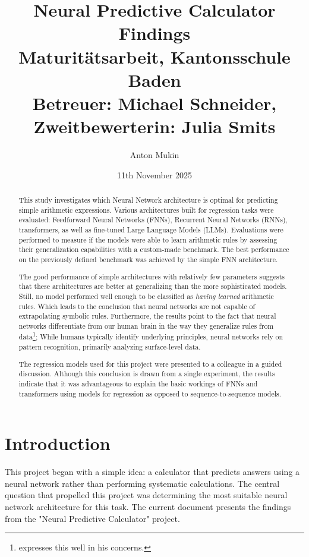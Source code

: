 \documentclass{article}
\title{\huge Neural Predictive Calculator
\\[0em]
{\LARGE Findings}
\\[0em]
{\large Maturitätsarbeit, Kantonsschule Baden}
\\[-0.5em]
{\large Betreuer: Michael Schneider, Zweitbewerterin: Julia Smits}}
\author{Anton Mukin}
\date{11th November 2025}
\begin{document}
\maketitle

\begin{abstract}
    This study investigates which Neural Network architecture is optimal for predicting 
    simple arithmetic expressions. 
    Various architectures built for regression tasks were evaluated: Feedforward Neural Networks (FNNs), Recurrent Neural Networks (RNNs), transformers, 
    as well as fine-tuned Large Language Models (LLMs). Evaluations were performed to measure 
    if the models were able to learn arithmetic rules by assessing their generalization 
    capabilities with a custom-made benchmark. The best performance on the previously 
    defined benchmark was achieved by the simple FNN architecture.

    The good performance of simple architectures with relatively few parameters suggests that 
    these architectures are better at generalizing than the more sophisticated models.
    Still, no model performed well enough to be classified as \textit{having learned} arithmetic rules.
    Which leads to the conclusion that neural networks are not capable of extrapolating symbolic rules.
    Furthermore, the results point to the fact that neural networks differentiate from our human brain in the way they generalize rules from data\footnote{\cite{marcus2018deeplearningcriticalappraisal} expresses this well in his concerns.};
    While humans typically identify underlying principles, neural networks rely on pattern recognition, primarily analyzing surface-level data.

    The regression models used for this project were presented to a colleague in a guided discussion. Although this conclusion is drawn from a single experiment, the results indicate that it was advantageous to explain the basic workings of FNNs and transformers using models for regression as opposed to sequence-to-sequence models.


\end{abstract}

\newpage
\tableofcontents
\vspace{-1em}
\listoffigures
\newpage

\section{Introduction}
This project began with a simple idea: a calculator that predicts answers using a neural network rather than performing systematic calculations. The central question that propelled this project was determining the most suitable neural network architecture for this task. The current document presents the findings from the "Neural Predictive Calculator" project.
\end{document}
